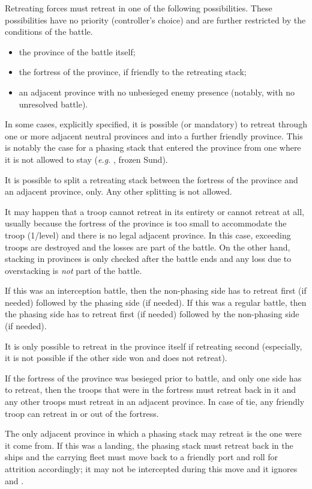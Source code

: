 Retreating forces must retreat in one of the following possibilities. These
possibilities have no priority (controller's choice) and are further
restricted by the conditions of the battle.
\begin{itemize}
\item the province of the battle itself;
\item the fortress of the province, if friendly to the retreating stack;
\item an adjacent province with no unbesieged enemy presence (notably, with no
  unresolved battle).
\end{itemize}

In some cases, explicitly specified, it is possible (or mandatory) to retreat
through one or more adjacent neutral provinces and into a further friendly
province. This is notably the case for a phasing stack that entered the
province from one where it is not allowed to stay (\emph{e.g.} \HRE, frozen
Sund).

It is possible to split a retreating stack between the fortress of the
province and an adjacent province, only. Any other splitting is not allowed.

It may happen that a troop cannot retreat in its entirety or cannot retreat at
all, usually because the fortress of the province is too small to accommodate
the troop (1\LD/level) and there is no legal adjacent province. In this case,
exceeding troops are destroyed and the losses are part of the battle. On the
other hand, stacking in provinces is only checked after the battle ends and
any loss due to overstacking is \emph{not} part of the battle.

If this was an interception battle, then the non-phasing side has to retreat
first (if needed) followed by the phasing side (if needed). If this was a
regular battle, then the phasing side has to retreat first (if needed)
followed by the non-phasing side (if needed).

It is only possible to retreat in the province itself if retreating second
(especially, it is not possible if the other side won and does not retreat).

If the fortress of the province was besieged prior to battle, and only one
side has to retreat, then the troops that were in the fortress must retreat
back in it and any other troops must retreat in an adjacent province. In case
of tie, any friendly troop can retreat in or out of the fortress.

The only adjacent province in which a phasing stack may retreat is the one
were it come from. If this was a landing, the phasing stack must retreat back
in the ships and the carrying fleet must move back to a friendly port and roll
for attrition accordingly; it may not be intercepted during this move and it
ignores \Presidios and \StraitFort.

